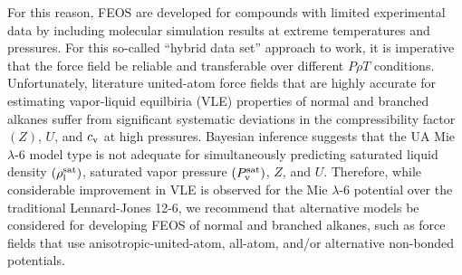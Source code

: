 \documentclass[11pt,a4paper]{article}
\begin{document}
	For this reason, FEOS are developed for compounds with limited experimental data by including molecular simulation results at extreme temperatures and pressures. For this so-called ``hybrid data set'' approach to work, it is imperative that the force field be reliable and transferable over different $P \rho T$ conditions. Unfortunately, literature united-atom force fields that are highly accurate for estimating vapor-liquid equilbiria (VLE) properties of normal and branched alkanes suffer from significant systematic deviations in the compressibility factor $(Z)$, $U$, and $c_{\rm v}$ at high pressures. Bayesian inference suggests that the UA Mie $\lambda$-6 model type is not adequate for simultaneously predicting saturated liquid density $(\rho_{\rm l}^{\rm sat})$, saturated vapor pressure $(P_{\rm v}^{\rm sat})$, $Z$, and $U$. Therefore, while considerable improvement in VLE is observed for the Mie $\lambda$-6 potential over the traditional Lennard-Jones 12-6, we recommend that alternative models be considered for developing FEOS of normal and branched alkanes, such as force fields that use anisotropic-united-atom, all-atom, and/or alternative non-bonded potentials.
			
			
\end{document}
